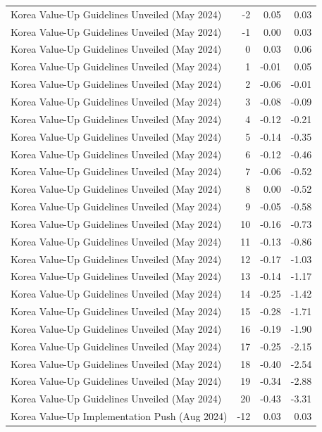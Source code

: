 \begin{table}
\begin{tabular}{lrrr}
Korea Value-Up Guidelines Unveiled (May 2024) & -2 & 0.05 & 0.03 \\
Korea Value-Up Guidelines Unveiled (May 2024) & -1 & 0.00 & 0.03 \\
Korea Value-Up Guidelines Unveiled (May 2024) & 0 & 0.03 & 0.06 \\
Korea Value-Up Guidelines Unveiled (May 2024) & 1 & -0.01 & 0.05 \\
Korea Value-Up Guidelines Unveiled (May 2024) & 2 & -0.06 & -0.01 \\
Korea Value-Up Guidelines Unveiled (May 2024) & 3 & -0.08 & -0.09 \\
Korea Value-Up Guidelines Unveiled (May 2024) & 4 & -0.12 & -0.21 \\
Korea Value-Up Guidelines Unveiled (May 2024) & 5 & -0.14 & -0.35 \\
Korea Value-Up Guidelines Unveiled (May 2024) & 6 & -0.12 & -0.46 \\
Korea Value-Up Guidelines Unveiled (May 2024) & 7 & -0.06 & -0.52 \\
Korea Value-Up Guidelines Unveiled (May 2024) & 8 & 0.00 & -0.52 \\
Korea Value-Up Guidelines Unveiled (May 2024) & 9 & -0.05 & -0.58 \\
Korea Value-Up Guidelines Unveiled (May 2024) & 10 & -0.16 & -0.73 \\
Korea Value-Up Guidelines Unveiled (May 2024) & 11 & -0.13 & -0.86 \\
Korea Value-Up Guidelines Unveiled (May 2024) & 12 & -0.17 & -1.03 \\
Korea Value-Up Guidelines Unveiled (May 2024) & 13 & -0.14 & -1.17 \\
Korea Value-Up Guidelines Unveiled (May 2024) & 14 & -0.25 & -1.42 \\
Korea Value-Up Guidelines Unveiled (May 2024) & 15 & -0.28 & -1.71 \\
Korea Value-Up Guidelines Unveiled (May 2024) & 16 & -0.19 & -1.90 \\
Korea Value-Up Guidelines Unveiled (May 2024) & 17 & -0.25 & -2.15 \\
Korea Value-Up Guidelines Unveiled (May 2024) & 18 & -0.40 & -2.54 \\
Korea Value-Up Guidelines Unveiled (May 2024) & 19 & -0.34 & -2.88 \\
Korea Value-Up Guidelines Unveiled (May 2024) & 20 & -0.43 & -3.31 \\
Korea Value-Up Implementation Push (Aug 2024) & -12 & 0.03 & 0.03 \\

\end{tabular}
\end{table}
